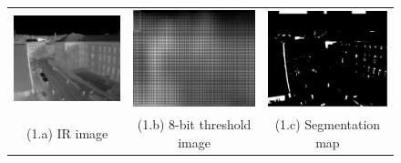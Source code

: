 \documentclass[runningheads]{llncs}
\begin{document}
\begin{figure}
  \centering
  \begin{tabular}{ccc}
    \includegraphics[width=4cm]{img/bg_sub/CLA_Infrared_Image_screenshot_03-08-2015.png} &
    \includegraphics[width=4cm]{img/bg_sub/CLA_Threshold_values(high)_screenshot_03-08-2015.png} &
    \includegraphics[width=4cm]{img/bg_sub/CLA_Segmentation_Map_screenshot_03-08-2015.png} \\
    \small (1.a) IR image & 
    \small (1.b) 8-bit threshold image &
    \small (1.c) Segmentation map
  \end{tabular}

  \vspace{\floatsep}


\end{figure}
\end{document}

